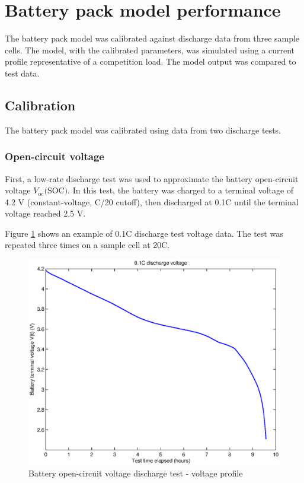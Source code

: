 \documentclass[../SimBALink.tex]{subfiles}
\begin{document}
\section{Battery pack model performance}
	The battery pack model was calibrated against discharge data from three sample cells. The model, with the calibrated parameters, was simulated using a current profile representative of a competition load. The model output was compared to test data.
	\subsection{Calibration}
		The battery pack model was calibrated using data from two discharge tests.
		
		\subsubsection{Open-circuit voltage}
			First, a low-rate discharge test was used to approximate the battery open-circuit voltage $V_\text{oc}(\text{SOC)}$. In this test, the battery was charged to a terminal voltage of 4.2 V (constant-voltage, C/20 cutoff), then discharged at 0.1C until the terminal voltage reached 2.5 V.  
			
			Figure \ref{fig:0.1C_Discharge_Voltage_Profile} shows an example of 0.1C discharge test voltage data. The test was repeated three times on a sample cell at 20\degree C.
		
			\begin{figure}[h!]
				\centering
				\includegraphics[width=5in]{../Model/Powertrain/Battery_pack/Documentation/Figures/Validation/0.1C_Discharge_Voltage_Profile}
				\caption{Battery open-circuit voltage discharge test - voltage profile}
				\label{fig:0.1C_Discharge_Voltage_Profile}
			\end{figure}
		
\end{document}
